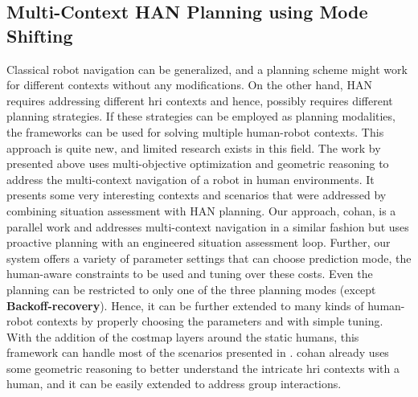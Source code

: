 \subsection{Multi-Context HAN Planning using Mode Shifting}
Classical robot navigation can be generalized, and a planning scheme might work for different contexts without any modifications. On the other hand, HAN requires addressing different \acrshort{hri} contexts and hence, possibly requires different planning strategies. If these strategies can be employed as planning modalities, the frameworks can be used for solving multiple human-robot contexts. This approach is quite new, and limited research exists in this field. The work by \cite{banisetty2020deep} presented above uses multi-objective optimization and geometric reasoning to address the multi-context navigation of a robot in human environments. It presents some very interesting contexts and scenarios that were addressed by combining situation assessment with HAN planning. Our approach, \acrshort{cohan}, is a parallel work and addresses multi-context navigation in a similar fashion but uses proactive planning with an engineered situation assessment loop. Further, our system offers a variety of parameter settings that can choose prediction mode, the human-aware constraints to be used and tuning over these costs. Even the planning can be restricted to only one of the three planning modes (except \textbf{Backoff-recovery}). Hence, it can be further extended to many kinds of human-robot contexts by properly choosing the parameters and with simple tuning. With the addition of the costmap layers around the static humans, this framework can handle most of the scenarios presented in \cite{banisetty2020deep}. \acrshort{cohan} already uses some geometric reasoning to better understand the intricate \acrshort{hri} contexts with a human, and it can be easily extended to address group interactions.

